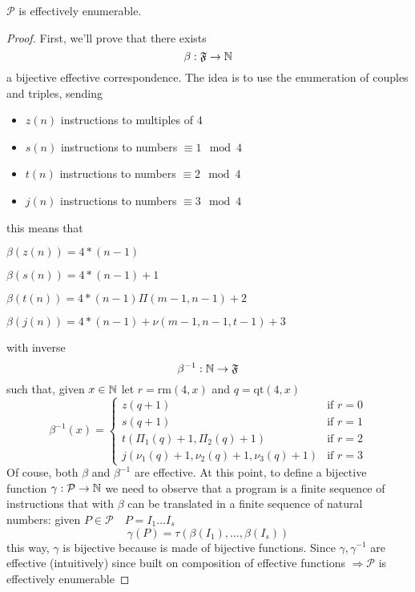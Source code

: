 \begin{theorem}
  $\mathcal{P}$ is effectively enumerable.
  \begin{proof}
    First, we'll prove that there exists
    \[\beta : \mathfrak{F} \rightarrow \mathbb{N} \]
    a bijective effective correspondence. The idea is to use the
    enumeration of couples and triples, sending
    \begin{itemize}
    \item $z(n)$ instructions to multiples of 4
    \item $s(n)$ instructions to numbers $\equiv 1 \mod 4$
    \item $t(n)$ instructions to numbers $\equiv 2 \mod 4$
    \item $j(n)$ instructions to numbers $\equiv 3 \mod 4$
    \end{itemize}
    this means that

    $\beta(z(n)) = 4*(n-1)$

    $\beta(s(n)) = 4*(n-1) + 1$

    $\beta(t(n)) = 4*(n-1) \Pi(m-1, n-1) + 2$

    $\beta(j(n)) = 4*(n-1) + \nu(m-1, n-1, t-1) + 3$

    with inverse \[\beta^{-1} : \mathbb{N} \rightarrow \mathfrak{F}\] such
    that, given $x \in \mathbb{N}$ let $r = \mbox{rm}(4,x)$ and
    $q = \mbox{qt}(4,x)$
    \[
      \beta^{-1}(x) = \begin{cases}
        z(q+1) & \mbox{if } r=0 \\
        s(q+1) & \mbox{if } r=1 \\
        t(\Pi_1(q)+1, \Pi_2(q)+1) & \mbox{if } r=2 \\
        j(\nu_1(q)+1, \nu_2(q)+1, \nu_3(q)+1) & \mbox{if } r=3
      \end{cases}
    \]
    Of couse, both $\beta$ and $\beta^{-1}$ are effective. At this
    point, to define a bijective function
    $\gamma : \mathcal{P} \rightarrow \mathbb{N}$ we need to observe that a
    program is a finite sequence of instructions that with $\beta$ can
    be translated in a finite sequence of natural numbers: given
    $P \in \mathcal{P} \quad P = I_1 \dots I_s$
    \[\gamma(P) = \tau(\beta(I_1), \dots, \beta(I_s))\]
    this way, $\gamma$ is bijective because is made of bijective
    functions. Since $\gamma, \gamma^{-1}$ are effective (intuitively)
    since built on composition of effective functions
    $\Rightarrow \mathcal{P}$ is effectively enumerable
  \end{proof}
\end{theorem}

